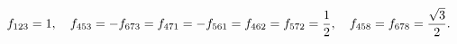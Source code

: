 \begin{equation}
f_{123}=1, \quad 
f_{453}=-f_{673}=f_{471}=-f_{561}=f_{462}=f_{572}={1\over 2}, \quad
f_{458}=f_{678}={\sqrt 3\over 2}.
\end{equation}

